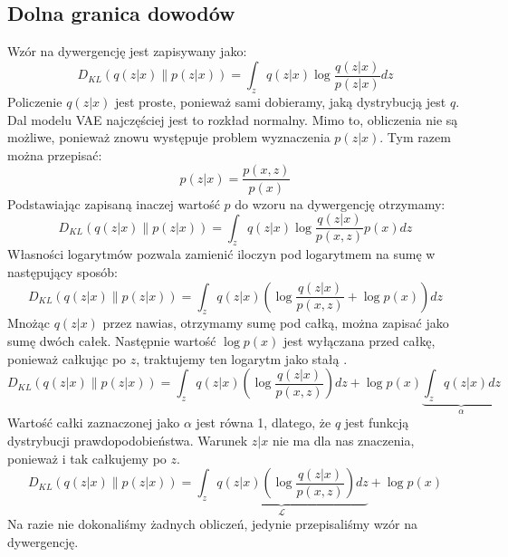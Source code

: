 \documentclass[a4paper,12pt,oneside]{book} %
\begin{document}
\subsection{Dolna granica dowodów}
Wzór na dywergencję jest zapisywany jako:
\begin{equation}
	D_{KL}(q(z|x)\|p(z|x))=\displaystyle\int_{z}^{}q(z|x)\log\frac{q(z|x)}{p(z|x)}dz
	\label{kld1}
\end{equation}
Policzenie $q(z|x)$ jest proste, ponieważ sami dobieramy, jaką dystrybucją jest $q$. Dal modelu VAE najczęściej jest to rozkład normalny. Mimo to, obliczenia nie są możliwe, ponieważ znowu występuje problem wyznaczenia $p(z|x)$. Tym razem można przepisać:
\begin{equation}
	p(z|x)=\dfrac{p(x,z)}{p(x)}
	\label{bayesinaczej}
\end{equation}
Podstawiając zapisaną inaczej wartość $p$ do wzoru na dywergencję otrzymamy:
\begin{equation}
	D_{KL}(q(z|x)\|p(z|x))=\displaystyle\int_{z}^{}q(z|x)\log\frac{q(z|x)}{p(x,z)}p(x)dz
	\label{kldlogarytmy}
\end{equation}
Własności logarytmów pozwala zamienić iloczyn pod logarytmem na sumę w następujący sposób:
\begin{equation}
	D_{KL}(q(z|x)\|p(z|x))=\displaystyle\int_{z}^{}q(z|x)\left( \log\frac{q(z|x)}{p(x,z)} + \log p(x)\right) dz
	\label{kldcalka}
\end{equation}
Mnożąc $q(z|x)$ przez nawias, otrzymamy sumę pod całką, można zapisać jako sumę dwóch całek. Następnie wartość $\log p(x)$ jest wyłączana przed całkę, ponieważ całkując po $z$, traktujemy ten logarytm jako stałą \cite{filmik1}.
\begin{equation}
	D_{KL}(q(z|x)\|p(z|x))=\displaystyle\int_{z}^{}q(z|x)\left( \log\frac{q(z|x)}{p(x,z)}\right)dz + \log p(x)\underbrace{\displaystyle\int_{z}^{}q(z|x)dz}_{\text{$\alpha$}}
	\label{calkaalpha}
\end{equation}
Wartość całki zaznaczonej jako $\alpha$ jest równa 1, dlatego, że $q$ jest funkcją dystrybucji prawdopodobieństwa. Warunek $z|x$ nie ma dla nas znaczenia, ponieważ i tak całkujemy po $z$.
\begin{equation}
	D_{KL}(q(z|x)\|p(z|x))=\underbrace{\displaystyle\int_{z}^{}q(z|x)\left( \log\frac{q(z|x)}{p(x,z)}\right)dz}_{\text{$\mathcal{L}$}} + \log p(x)
	\label{kldfinal}
\end{equation}
Na razie nie dokonaliśmy żadnych obliczeń, jedynie przepisaliśmy wzór na dywergencję.
\end{document}
